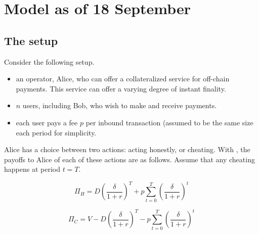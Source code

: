 \section{Model as of 18 September}

\subsection{The setup}

Consider the following setup.

\begin{itemize}
    \item an operator, Alice, who can offer a collateralized service for off-chain payments. This service can offer a varying degree of instant finality. 
    \item $n$ users, including Bob, who wish to make and receive payments. 
    \item each user pays a fee $p$ per inbound transaction (assumed to be the same size each period for simplicity.
\end{itemize}

Alice has a choice between two actions: acting honestly, or cheating. 
With \sys, the payoffs to Alice of each of these actions are as follows.
Assume that any cheating happens at period $t=T$.

\begin{equation}
\label{eq:promise_honest}
\Pi_H = D(\frac{\delta}{1+r})^T+p\sum^{T}_{t=0}(\frac{\delta}{1+r})^t
\end{equation}


\begin{equation}
\label{eq:promise_cheat}
\Pi_C = V-D(\frac{\delta}{1+r})^T-p\sum^{T}_{t=0}(\frac{\delta}{1+r})^t
\end{equation}


